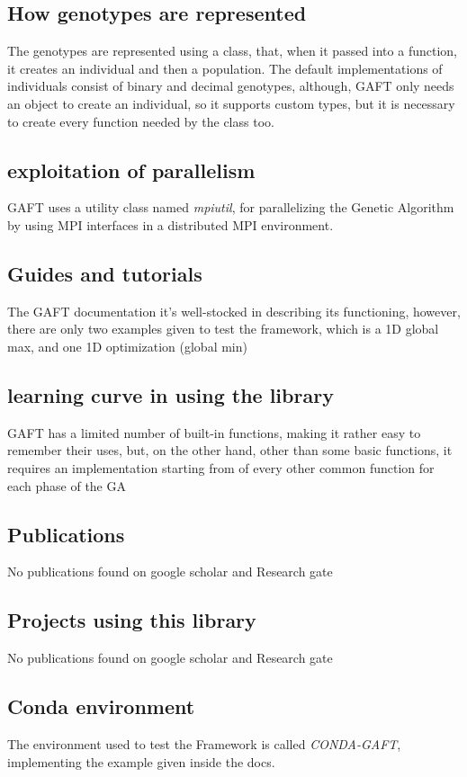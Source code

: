 \documentclass{article}
\begin{document}
	\subsection{How genotypes are represented}
	The genotypes are represented using a class, that, when it passed into a function, it creates an individual and then a population. The default implementations of individuals consist of binary and decimal genotypes, although, GAFT only needs an object to create an individual, so it supports custom types, but it is necessary to create every function needed by the class too.
	\subsection{exploitation of parallelism}
	GAFT uses a utility class named \textit{mpiutil}, for parallelizing the Genetic Algorithm by using MPI interfaces in a distributed MPI environment.
	\subsection{Guides and tutorials}
	The GAFT documentation it's well-stocked in describing its functioning, however, there are only two examples given to test the framework, which is a 1D global max, and one 1D optimization (global min)
	\subsection{learning curve in using the library}
	GAFT has a limited number of built-in functions, making it rather  easy to remember their uses, but, on the other hand, other than some basic functions, it requires an implementation starting from of every other common function for each phase of the GA
	\subsection{Publications}
	No publications found on google scholar and Research gate
	\subsection{Projects using this library}
	No publications found on google scholar and Research gate
	\subsection{Conda environment}
	The environment used to test the Framework is called \textit{CONDA-GAFT}, implementing the example given inside the docs. 
\end{document}
